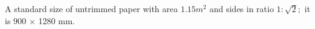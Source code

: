 A standard size of untrimmed paper with area $1.15m^{2}$  and sides in ratio
$ 1 : \sqrt{2} ; $ it is 900 \ensuremath{ \times } 1280 mm.